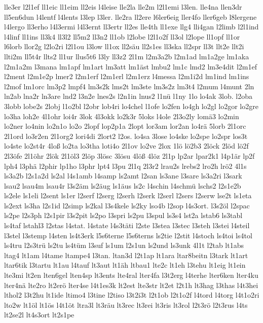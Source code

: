 {lle3er
l2l1ef
ll1eic
ll1eim
ll2eis
l4leise
lle2la
lle2m
l2l1emi
l3len.
lle4na
llen3dr
ll5en6dun
l4lentf
l4lents
l3lep
l3ler.
lle2ra
ll2ere
l6ler6eig
ller4fo
ller6geb
l8lergene
l4lergo
ll3erho
l4l3ermi
l4l3ernt
ll3ertr
ll2es
lle4th
ll1exe
llg4
lli4gan
l2limb
l2l1ind
l4linf
ll1ins
ll3k4
ll3l2
ll5m2
ll3n2
ll1ob
l2lobe
l2l1o2f
ll3ol
l2lope
ll1opf
ll1or
l6lorb
llor2g
l2lo2ri
l2l1ou
l3low
ll1ox
ll2säu
ll2s1es
ll3ska
ll2spr
ll3t
llt2e
llt2i
llti2m
ll5t4r
llts2
ll1ur
llus5t6
l3ly
ll3z2
2l1m
l2m3a2b
l2m1ad
lm1a2ge
lm1aka
l2m1a2m
l3mana
lm1apf
lm1art
lm3att
lm1äst
lmbu2
lm1c
lmd2
lm3e4dit
l2m1ef
l2ment
l2m1e2p
lmer2
l2m1erf
l2m1erl
l2m1erz
l4messa
l2m1i2d
lm1ind
lm1ins
l2mof
lm1orc
lm3p2
lmpf4
lm3s2k
lms2t
lm3ste
lm3s2z
lm3t4
l2mum
l4munt
2ln
ln2ab
lna2r
ln3are
lnd2
l3n2e
lnes2s
l2n1in
lnus2
l1nü
l1ny
1lo
lo4ak
3lob.
l2oba
3lobb
lobe2s
2lobj
l1o2bl
l2obr
lob4ri
lo4chel
l1ofe
lo2fen
lo4gh
lo2gl
lo2gor
lo2gre
lo3ha
loh2e
4l1ohr
loi4r
3lok
4l3okk
lo2k3r
5loks
l4ole
2l3o2ly
lomä3
lo2min
lo2ner
lo4nin
lo2n1o
lo2o
2lopf
lop2p1a
2lopt
lor3am
lor2an
lo4rä
5lorb
2l1orc
2l1ord
lo3r2en
2l1org2
lori4di
2lort2
l2os.
lo4sa
3lose
lo4ske
lo2spe
lo2spr
los3t
lo4ste
lo2st4r
4loß
lo2ta
lo3tha
loti4o
2l1ov
lo2ve
2lox
1lö
lö2b3
2löck
2löd
lö2f
2l3öfe
2l1öhr
2lök
2l1öl3
2löp
3lösc
3lösu
4löß
4löz
2l1p
lp2ar
lpar2k1
l4p1är
lp2f
lph4
l3phä
l2phir
lp1ho
l3phr
lpt4
l3pu
2l1q
2l3r2
lrau2s
lrebs2
lro2h
lrö2
4l1s
ls3a2b
l2s1a2d
ls2al
l4s1amb
l4samp
ls2amt
l2san
ls3ane
l3sare
ls3a2ri
l3sark
lsau2
lsau4m
lsau4r
l3s2äm
ls2äug
ls1äus
ls2c
l4schin
l4schmü
lschs2
l2s1e2b
ls2ele
ls1eli
l2sent
ls1er
l2serf
l2serg
l2serh
l2serk
l2serl
l2sers
l2serw
lse2t
ls1eta
ls2ext
ls3ha
l2s1id
l2simp
ls2kal
l3s4kele
ls2ky
lso4b
l2sop
l4s3ort.
l3s2öl
l2spac
ls2pe
l2s3ph
l2s1pir
l3s2pit
ls2po
l3spri
ls2pu
l3spul
ls3s4
lst2a
lstab6
ls3tabl
ls4taf
lstahl3
l2stas
l4stat.
l4state
l4s3täti
l2ste
l3stea
l3stec
l3steh
l3stei
l4steil
l3stel
l3stemp
l4sten
ls4t3erk
l5s6terne
l5s6terns
ls2tie
l2stit
l4stoch
ls4toi
ls4tol
ls4tru
l2s3trü
ls2tu
ls4tüm
l3suf
ls1um
l2s1un
ls2und
ls3unk
4l1t
l2tab
lt1abs
ltag4
lt1am
l4tame
ltampe4
l3tan.
ltan3d
l2t1ap
lt1ara
ltar8beitn
l3tark
lt1art
ltar6tik
l3tartu
lt1au
l4tauf
lt3aut
lt1äh
ltbau1
lte2c
lt1eh
l3tehu
lt1eig
lt1ein
lte3mi
lt2en
lten6gel
lten4sp
lt3ents
lte4ral
lter4fa
l3t2erg
l4terhe
lter6ken
lter4ku
lter4nä
lte2ro
lt2erö
lter4se
l4t1es3k
lt2est
lte3str
lt2et
l2t1h
lt3hag
l3thas
l4t3hei
lthol2
l3t2hu
lt1ide
ltimo4
l3tine
l2tiso
l3t2i3t
l2t1ob
l2t1o2f
l4tord
l4torg
l4t1o2ri
lto2w
lt1öl
lt1ös
l4t1öt
ltra3l
lt3räu
lt3rec
lt3rei
lt3ris
lt3rol
l2t3rö
l2t3rus
l4ts
lt2se2l
lt4s3ort
lt2s1pe
}
